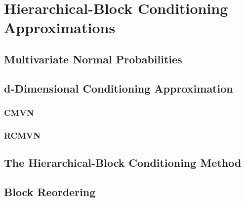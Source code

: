 \chapter{Hierarchical-Block Conditioning Approximations}

\section{Multivariate Normal Probabilities} 

\section{d-Dimensional Conditioning Approximation}

\subsection{CMVN}
\subsection{RCMVN}

\section{The Hierarchical-Block Conditioning Method}

\section{Block Reordering}